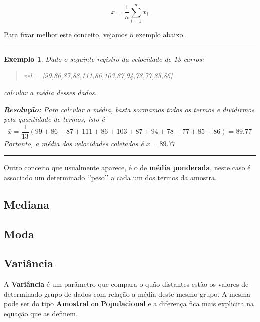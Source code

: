 \documentclass[
]{book}
\newtheorem{example}{Exemplo}
\begin{document}
\begin{equation}
  \bar{x} = \frac{1}{n} \sum_{i=1}^n x_i
  \label{eq:media}
\end{equation}

Para fixar melhor este conceito, vejamos o exemplo abaixo.

\begin{center}\rule{0.5\linewidth}{0.5pt}\end{center}

\begin{example}
Dado o seguinte registro da velocidade de 13 carros:

\begin{quote}
vel = {[}99,86,87,88,111,86,103,87,94,78,77,85,86{]}
\end{quote}

calcular a média desses dados.

\textbf{Resolução:} Para calcular a média, basta sormamos todos os termos e dividirmos pela quantidade de termos, isto é
\[
\bar{x} = \frac{1}{13}(99+86+87+111+86+103+87+94+78+77+85+86) = 89.77
\]
Portanto, a média das velocidades coletadas é \(\bar{x} = 89.77\)
\end{example}

\begin{center}\rule{0.5\linewidth}{0.5pt}\end{center}

Outro conceito que usualmente aparece, é o de \textbf{média ponderada}, neste caso é associado um determinado `'peso'' a cada um dos termos da amostra.

\hypertarget{mediana}{%
\subsection{Mediana}\label{mediana}}

\hypertarget{moda}{%
\subsection{Moda}\label{moda}}

\hypertarget{variuxe2ncia}{%
\subsection{Variância}\label{variuxe2ncia}}

A \textbf{Variância} é um parâmetro que compara o quão distantes estão os valores de determinado grupo de dados com relação a média deste mesmo grupo. A mesma pode ser do tipo \textbf{Amostral} ou \textbf{Populacional} e a diferença fica mais explicita na equação que as definem.
\end{document}
